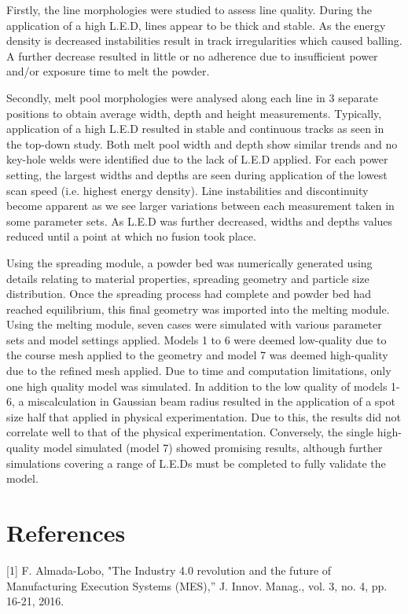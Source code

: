 \documentclass[10pt]{article}
\begin{document}
Firstly, the line morphologies were studied to assess line quality. During the application of a high L.E.D, lines appear to be thick and stable. As the energy density is decreased instabilities result in track irregularities which caused balling. A further decrease resulted in little or no adherence due to insufficient power and/or exposure time to melt the powder.

Secondly, melt pool morphologies were analysed along each line in 3 separate positions to obtain average width, depth and height measurements. Typically, application of a high L.E.D resulted in stable and continuous tracks as seen in the top-down study. Both melt pool width and depth show similar trends and no key-hole welds were identified due to the lack of L.E.D applied. For each power setting, the largest widths and depths are seen during application of the lowest scan speed (i.e. highest energy density). Line instabilities and discontinuity become apparent as we see larger variations between each measurement taken in some parameter sets. As L.E.D was further decreased, widths and depths values reduced until a point at which no fusion took place.

Using the spreading module, a powder bed was numerically generated using details relating to material properties, spreading geometry and particle size distribution. Once the spreading process had complete and powder bed had reached equilibrium, this final geometry was imported into the melting module. Using the melting module, seven cases were simulated with various parameter sets and model settings applied. Models 1 to 6 were deemed low-quality due to the course mesh applied to the geometry and model 7 was deemed high-quality due to the refined mesh applied. Due to time and computation limitations, only one high quality model was simulated. In addition to the low quality of models 1-6, a miscalculation in Gaussian beam radius resulted in the application of a spot size half that applied in physical experimentation. Due to this, the results did not correlate well to that of the physical experimentation. Conversely, the single high-quality model simulated (model 7) showed promising results, although further simulations covering a range of L.E.Ds must be completed to fully validate the model.

\section*{References}
[1] F. Almada-Lobo, "The Industry 4.0 revolution and the future of Manufacturing Execution Systems (MES),” J. Innov. Manag., vol. 3, no. 4, pp. 16-21, 2016.
\end{document}
